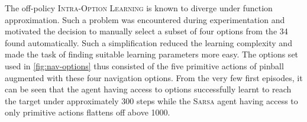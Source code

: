 The off-policy \textsc{Intra-Option Learning} is known to diverge under function approximation. Such a problem was encountered during experimentation and motivated the decision to manually select a subset of four options from the 34 found automatically. Such a simplification reduced the learning complexity and made the task of finding suitable learning parameters more easy. The options set used in \ref{fig:nav-options} thus consisted of the five primitive actions of pinball augmented with these four navigation options. From the very few first episodes, it can be seen that the agent having access to options successfully learnt to reach the target under approximately 300 steps while the \textsc{Sarsa} agent having access to only primitive actions flattens off above 1000. 

